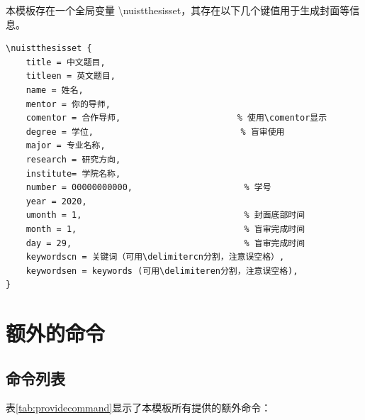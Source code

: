 \documentclass{nuistthesis}
\begin{document}
本模板存在一个全局变量 \textbackslash nuistthesisset，其存在以下几个键值用于生成封面等信息。
\begin{lstlisting}
\nuistthesisset {
    title = 中文题目,
    titleen = 英文题目,
    name = 姓名,
    mentor = 你的导师,
    comentor = 合作导师,                       % 使用\comentor显示
    degree = 学位,                             % 盲审使用 
    major = 专业名称,
    research = 研究方向,
    institute= 学院名称,
    number = 00000000000,                      % 学号
    year = 2020,
    umonth = 1,                                % 封面底部时间
    month = 1,                                 % 盲审完成时间
    day = 29,                                  % 盲审完成时间
    keywordscn = 关键词（可用\delimitercn分割，注意误空格）,
    keywordsen = keywords (可用\delimiteren分割，注意误空格),
}
\end{lstlisting}

\section{额外的命令}

\subsection{命令列表}

表\ref{tab:providecommand}显示了本模板所有提供的额外命令：
\end{document}
